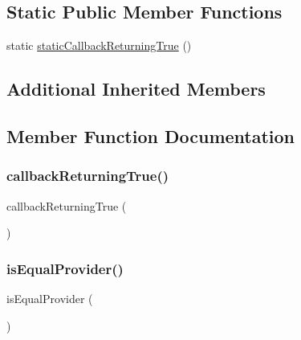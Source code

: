 \subsection*{Static Public Member Functions}
\begin{DoxyCompactItemize}
\item 
static \mbox{\hyperlink{class_framework___constraint_test_a05aaa29767fe41653591c11b488d2a33}{static\+Callback\+Returning\+True}} ()
\end{DoxyCompactItemize}
\subsection*{Additional Inherited Members}


\subsection{Member Function Documentation}
\mbox{\label{class_framework___constraint_test_ac8b5e7ee10b2dfc4efa4464004daeca4}} 
\subsubsection{\texorpdfstring{callback\+Returning\+True()}{callbackReturningTrue()}}
{\footnotesize\ttfamily callback\+Returning\+True (\begin{DoxyParamCaption}{ }\end{DoxyParamCaption})}

\mbox{\label{class_framework___constraint_test_a4198d3f731f9e6a29ffb3cd97ec538ef}} 
\subsubsection{\texorpdfstring{is\+Equal\+Provider()}{isEqualProvider()}}
{\footnotesize\ttfamily is\+Equal\+Provider (\begin{DoxyParamCaption}{ }\end{DoxyParamCaption})}

